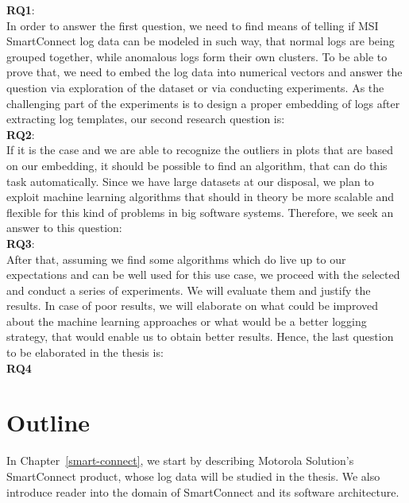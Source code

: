 \textbf{RQ1}: \textit{\RQFirst}\\
    
In order to answer the first question, we need to find means of telling if MSI SmartConnect log data can be modeled in such way, that normal logs are being grouped together, while anomalous logs form their own clusters. To be able to prove that, we need to embed the log data into numerical vectors and answer the question via exploration of the dataset or via conducting experiments. As the challenging part of the experiments is to design a proper embedding of logs after extracting log templates, our second research question is:\\ 

\textbf{RQ2}: \textit{\RQSecond}\\

If it is the case and we are able to recognize the outliers in plots that are based on our embedding, it should be possible to find an algorithm, that can do this task automatically. Since we have large datasets at our disposal, we plan to exploit machine learning algorithms that should in theory be more scalable and flexible for this kind of problems in big software systems.
Therefore, we seek an answer to this question:\\


\textbf{RQ3}: \textit{\RQThird}\\
    
After that, assuming we find some algorithms which do live up to our expectations and can be well used for this use case, we proceed with the selected and conduct a series of experiments.
We will evaluate them and justify the results. In case of poor results, we will elaborate on what could be improved about the machine learning approaches or what would be a better logging strategy, that would enable us to obtain better results.
Hence, the last question to be elaborated in the thesis is:\\

\textbf{RQ4} \textit{\RQFourth}\\ 
    

\section{Outline}
In Chapter~\ref{smart-connect}, we start by describing Motorola Solution's SmartConnect product, whose log data will be studied in the thesis. We also introduce reader into the domain of SmartConnect and its software architecture.

